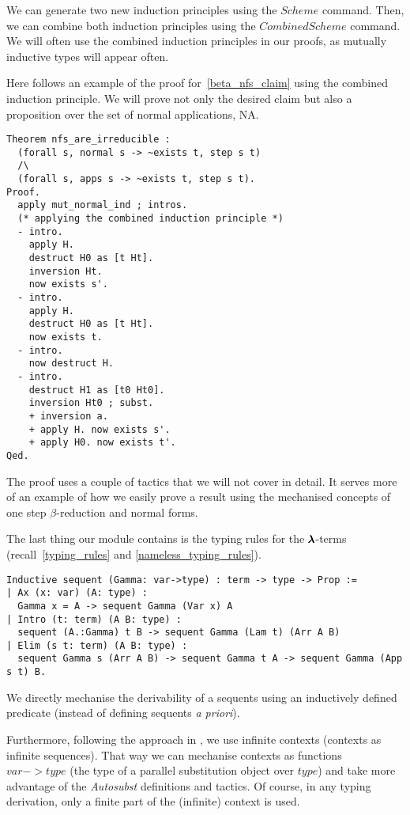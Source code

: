 We can generate two new induction principles using the \lst$Scheme$ command.
Then, we can combine both induction principles using the \lst$Combined Scheme$ command.
We will often use the combined induction principles in our proofs, as mutually inductive types will appear often. 

Here follows an example of the proof for~\cref{beta_nfs_claim} using the combined induction principle.
We will prove not only the desired claim but also a proposition over the set of normal applications, NA.

\begin{lstlisting}[language=Coq]
Theorem nfs_are_irreducible :
  (forall s, normal s -> ~exists t, step s t)
  /\
  (forall s, apps s -> ~exists t, step s t).
Proof.
  apply mut_normal_ind ; intros.
  (* applying the combined induction principle *)
  - intro.
    apply H.
    destruct H0 as [t Ht].
    inversion Ht.
    now exists s'.
  - intro.
    apply H.
    destruct H0 as [t Ht].
    now exists t.
  - intro.
    now destruct H.
  - intro.
    destruct H1 as [t0 Ht0].
    inversion Ht0 ; subst.
    + inversion a.
    + apply H. now exists s'.
    + apply H0. now exists t'.
Qed.
\end{lstlisting}

The proof uses a couple of tactics that we will not cover in detail.
It serves more of an example of how we easily prove a result using the mechanised concepts of one step $\beta$-reduction and normal forms.

The last thing our module contains is the typing rules for the $\pmb{\lambda}$-terms (recall~\cref{typing_rules} and \cref{nameless_typing_rules}).

\begin{lstlisting}[language=Coq]
Inductive sequent (Gamma: var->type) : term -> type -> Prop := 
| Ax (x: var) (A: type) :
  Gamma x = A -> sequent Gamma (Var x) A
| Intro (t: term) (A B: type) :
  sequent (A.:Gamma) t B -> sequent Gamma (Lam t) (Arr A B)
| Elim (s t: term) (A B: type) :
  sequent Gamma s (Arr A B) -> sequent Gamma t A -> sequent Gamma (App s t) B.
\end{lstlisting}

We directly mechanise the derivability of a sequents using an inductively defined predicate (instead of defining sequents \textit{a priori}).

Furthermore, following the approach in \cite{AutosubstManual}, we use infinite contexts (contexts as infinite sequences).
That way we can mechanise contexts as functions \lst$var->type$ (the type of a parallel substitution object over \lst$type$) and take more advantage of the \textit{Autosubst} definitions and tactics.
Of course, in any typing derivation, only a finite part of the (infinite) context is used.


